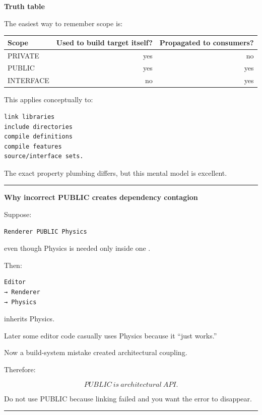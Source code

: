 \textbf{Truth table}

The easiest way to remember scope is:

{\def\LTcaptype{none} %
\begin{longtable}[]{@{}lrr@{}}
\toprule\noalign{}
Scope & Used to build target itself? & Propagated to consumers? \\
\midrule\noalign{}
\endhead
\bottomrule\noalign{}
\endlastfoot
PRIVATE & yes & no \\
PUBLIC & yes & yes \\
INTERFACE & no & yes \\
\end{longtable}
}

This applies conceptually to:

\begin{verbatim}
link libraries
include directories
compile definitions
compile features
source/interface sets.
\end{verbatim}

The exact property plumbing differs, but this mental model is excellent.

\begin{center}\rule{0.5\linewidth}{0.5pt}\end{center}

\textbf{Why incorrect PUBLIC creates dependency contagion}

Suppose:

\begin{verbatim}
Renderer PUBLIC Physics
\end{verbatim}

even though Physics is needed only inside one .

Then:

\begin{verbatim}
Editor
→ Renderer
→ Physics
\end{verbatim}

inherits Physics.

Later some editor code casually uses Physics because it ``just works.''

Now a build-system mistake created architectural coupling.

Therefore:

\[
\boxed{
PUBLIC\ is\ architectural\ API.
}
\]

Do not use PUBLIC because linking failed and you want the error to disappear.

\begin{center}\rule{0.5\linewidth}{0.5pt}\end{center}

